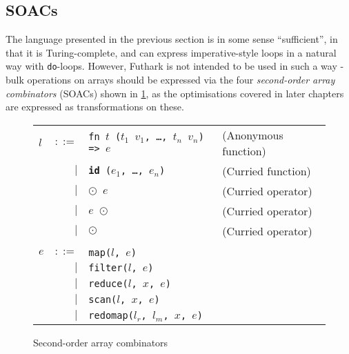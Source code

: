 \documentclass[oneside]{memoir}
\begin{document}
\subsection{SOACs}
\label{sec:soacs}

The language presented in the previous section is in some sense
``sufficient'', in that it is Turing-complete, and can express
imperative-style loops in a natural way with \texttt{do}-loops.
However, Futhark is not intended to be used in such a way - bulk
operations on arrays should be expressed via the four
\textit{second-order array combinators} (SOACs) shown in
\cref{fig:soacs}, as the optimisations covered in later chapters are
expressed as transformations on these.

\begin{figure}[bt]
\begin{tabular}{lrll}
$l$ & $::=$ & \texttt{fn $t$ ($t_{1}$ $v_{1}$, \ldots, $t_{n}$ $v_{n}$) => $e$} & (Anonymous function) \\
& $|$ & \texttt{\textbf{id} ($e_{1}$, \ldots, $e_{n}$)} & (Curried function) \\
& $|$ & \texttt{$\odot$ $e$} & (Curried operator) \\
& $|$ & \texttt{$e$ $\odot$} & (Curried operator) \\
& $|$ & \texttt{$\odot$}     & (Curried operator) \\
\\
$e$ & $::=$ & \texttt{map($l$, $e$)} \\
    & $|$ & \texttt{filter($l$, $e$)} \\
    & $|$ & \texttt{reduce($l$, $x$, $e$)} \\
    & $|$ & \texttt{scan($l$, $x$, $e$)} \\
    & $|$ & \texttt{redomap($l_{r}$, $l_{m}$, $x$, $e$)} \\
\end{tabular}
\caption{Second-order array combinators}
\label{fig:soacs}
\end{figure}
\end{document}
